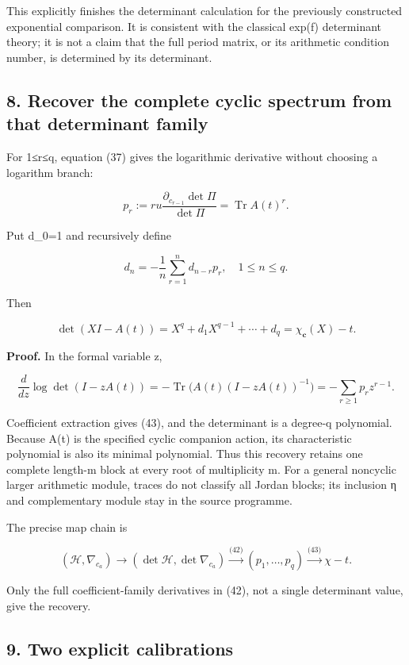 This explicitly finishes the determinant calculation for the previously constructed exponential comparison. It is consistent with the classical exp(f) determinant theory; it is not a claim that the full period matrix, or its arithmetic condition number, is determined by its determinant.

\subsection{8. Recover the complete cyclic spectrum from that determinant family}\label{endpoint-sga_trace_period--recover-the-complete-cyclic-spectrum-from-that-determinant-family}

For 1≤r≤q, equation (37) gives the logarithmic derivative without choosing a logarithm branch:

\[
p_r:=r u\frac{\partial_{c_{r-1}}\det\Pi}{\det\Pi}
 =\operatorname{Tr}A(t)^r.
\tag{42}
\]

Put d\_0=1 and recursively define

\[
d_n=-\frac1n\sum_{r=1}^n d_{n-r}p_r,
\quad1\le n\le q.
\tag{43}
\]

Then

\[
\boxed{\det(XI-A(t))=X^q+d_1X^{q-1}+\cdots+d_q
 =\chi_{\mathbf c}(X)-t.}
\tag{44}
\]

\textbf{Proof.} In the formal variable z,

\[
\frac{d}{dz}\log\det(I-zA(t))
 =-\operatorname{Tr}\bigl(A(t)(I-zA(t))^{-1}\bigr)
 =-\sum_{r\ge1}p_rz^{r-1}.
\tag{45}
\]

Coefficient extraction gives (43), and the determinant is a degree-q polynomial. Because A(t) is the specified cyclic companion action, its characteristic polynomial is also its minimal polynomial. Thus this recovery retains one complete length-m block at every root of multiplicity m. For a general noncyclic larger arithmetic module, traces do not classify all Jordan blocks; its inclusion η and complementary module stay in the source programme.

The precise map chain is

\[
(\mathcal H,\nabla_{c_a})\longrightarrow
(\det\mathcal H,\det\nabla_{c_a})
\xrightarrow{\text{(42)}}(p_1,\ldots,p_q)
\xrightarrow{\text{(43)}}\chi-t.
\tag{46}
\]

Only the full coefficient-family derivatives in (42), not a single determinant value, give the recovery.

\subsection{9. Two explicit calibrations}\label{endpoint-sga_trace_period--two-explicit-calibrations}

